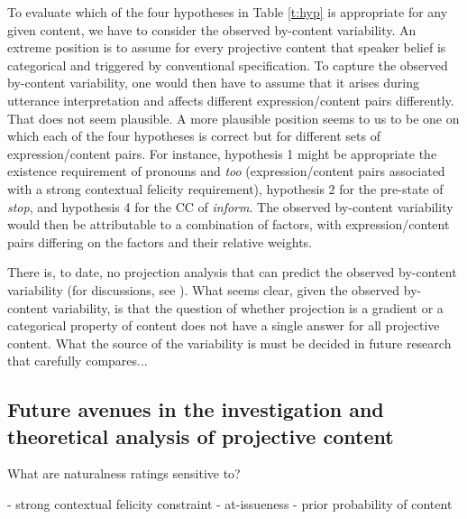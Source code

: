 \documentclass[11pt,fleqn]{article}
\newcommand{\6}{\mbox{$[\hspace*{-.6mm}[$}}
\newcommand{\9}{\mbox{$]\hspace*{-.6mm}]$}}
\begin{document}
To evaluate which of the four hypotheses in Table \ref{t:hyp} is appropriate for any given content, we have to consider the observed by-content variability. An extreme position is to assume for every projective content that speaker belief is categorical and triggered by conventional specification. To capture the observed by-content variability, one would then have to assume that it arises during utterance interpretation and affects different expression/content pairs differently. That does not seem plausible. A more plausible position seems to us to be one on which each of the four hypotheses is correct but for different sets of expression/content pairs. For instance, hypothesis 1 might be appropriate  the existence requirement of pronouns and {\em too} (expression/content pairs associated with a strong contextual felicity requirement), hypothesis 2 for the pre-state of {\em stop}, and hypothesis 4 for the CC of {\em inform}. The observed by-content variability would then be attributable to a combination of factors, with expression/content pairs differing on the factors and their relative weights. 

There is, to date, no projection analysis that can predict the observed by-content variability (for discussions, see \citealt{tbd-variability,degen-tonhauser-language}). What seems clear, given the observed by-content variability, is that the question of whether projection is a gradient or a categorical property of content does not have a single answer for all projective content. What the source of the variability is must be decided in future research that carefully compares...

\subsection{Future avenues in the investigation and theoretical analysis of projective content}\label{s:disc3}

What are naturalness ratings sensitive to?


- strong contextual felicity constraint
- at-issueness
- prior probability of content
\end{document}
